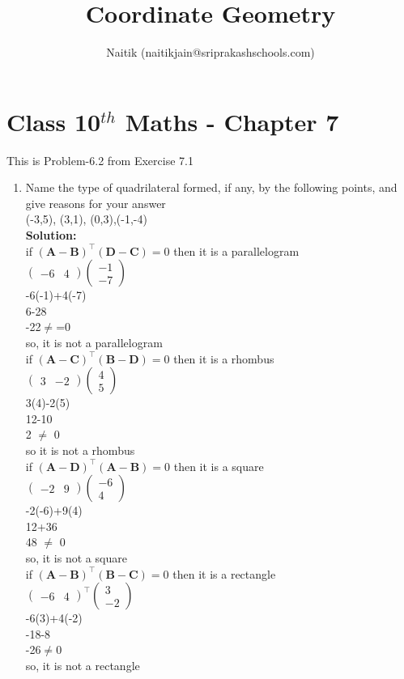 \documentclass[10pt]{article}
\title{Coordinate Geometry}
\author{Naitik (naitikjain@sriprakashschools.com)}
\newcommand{\myvec}[1]{\ensuremath{\begin{pmatrix}#1\end{pmatrix}}}
\newcommand{\solution}{\noindent \textbf{Solution: }}
\providecommand{\brak}[1]{\ensuremath{\left(#1\right)}}
\let\vec\mathbf
\begin{document}
\maketitle
\section*{Class 10$^{th}$ Maths - Chapter 7}
This is Problem-6.2 from Exercise 7.1
\begin{enumerate}
\item Name the type of quadrilateral formed, if any, by the following points, and give reasons for your answer\\
(-3,5), (3,1), (0,3),(-1,-4)\\
\solution\\
if $\brak{\vec{A}-\vec{B}}^{\top}\brak{\vec{D}-\vec{C}}=0$ then it is a parallelogram\\
$\myvec{-6&4}\myvec{-1\\-7}$\\
-6(-1)+4(-7)\\
6-28\\
-22$\neq$=0\\
so, it is not a parallelogram\\
if $\brak{\vec{A}-\vec{C}}^{\top}\brak{\vec{B}-\vec{D}}=0$ then it is a rhombus\\
$\myvec{3&-2}{\myvec{4\\5}}$\\
3(4)-2(5)\\
12-10\\
2 $\neq$ 0\\
so it is not a rhombus\\
if $\brak{\vec{A}-\vec{D}}^{\top}\brak{\vec{A}-\vec{B}}=0$ then it is a square\\
$\myvec{-2&9}{\myvec{-6\\4}}$\\
-2(-6)+9(4)\\
12+36\\
48 $\neq$ 0\\
so, it is not a square\\
if $\brak{\vec{A}-\vec{B}}^{\top}\brak{\vec{B}-\vec{C}}=0$ then it is a rectangle\\
$\myvec{-6&4}^{\top}{\myvec{3\\-2}}$\\
-6(3)+4(-2)\\
-18-8\\
-26$\neq$0\\
so, it is not a rectangle\\ 
\end{enumerate}
\end{document}
